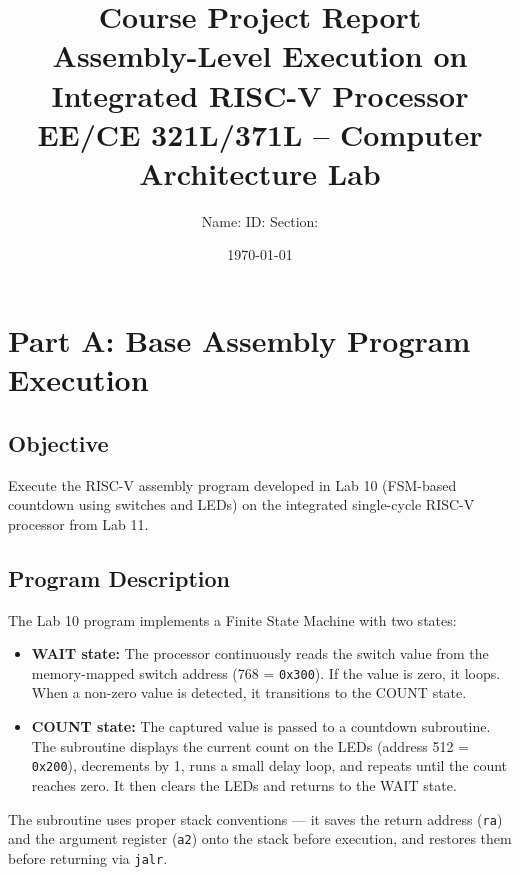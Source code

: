 \documentclass[12pt,a4paper]{article}
\title{
    \vspace{-1cm}
    \textbf{Course Project Report} \\
    \large Assembly-Level Execution on Integrated RISC-V Processor \\
    \vspace{0.3cm}
    \normalsize EE/CE 321L/371L -- Computer Architecture Lab
}
\author{
    Name: \underline{\hspace{4cm}} \quad
    ID: \underline{\hspace{3cm}} \quad
    Section: \underline{\hspace{2cm}}
}
\date{\today}
\begin{document}
\maketitle
\thispagestyle{fancy}

\section{Part A: Base Assembly Program Execution}

\subsection{Objective}
Execute the RISC-V assembly program developed in Lab 10 (FSM-based countdown using switches and LEDs) on the integrated single-cycle RISC-V processor from Lab 11.

\subsection{Program Description}
The Lab 10 program implements a Finite State Machine with two states:

\begin{itemize}
    \item \textbf{WAIT state:} The processor continuously reads the switch value from the memory-mapped switch address (768 = \texttt{0x300}). If the value is zero, it loops. When a non-zero value is detected, it transitions to the COUNT state.
    \item \textbf{COUNT state:} The captured value is passed to a countdown subroutine. The subroutine displays the current count on the LEDs (address 512 = \texttt{0x200}), decrements by 1, runs a small delay loop, and repeats until the count reaches zero. It then clears the LEDs and returns to the WAIT state.
\end{itemize}

The subroutine uses proper stack conventions --- it saves the return address (\texttt{ra}) and the argument register (\texttt{a2}) onto the stack before execution, and restores them before returning via \texttt{jalr}.
\end{document}
